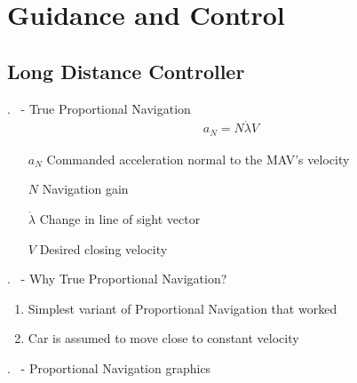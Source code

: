 \section{Guidance and Control}

\subsection{Long Distance Controller}
\begin{frame}{\thesection. \insertsection \ - \insertsubsection}
	True Proportional Navigation 
	\begin{align}
		a_N = N \dot{\lambda} V
	\end{align}
	\begin{enumerate}
	\item[$a_N$] Commanded acceleration normal to the MAV's velocity
	\item[$N$] Navigation gain
	\item[$\dot{\lambda}$] Change in line of sight vector
	\item[$V$] Desired closing velocity
	\end{enumerate}
\end{frame}


\begin{frame}{\thesection. \insertsection \ - \insertsubsection}
	Why True Proportional Navigation?
	\begin{enumerate}
		\item Simplest variant of Proportional Navigation that worked
		\item Car is assumed to move close to constant velocity
	\end{enumerate}
\end{frame}



\begin{frame}{\thesection. \insertsection \ - \insertsubsection}
	Proportional Navigation graphics
\end{frame}


